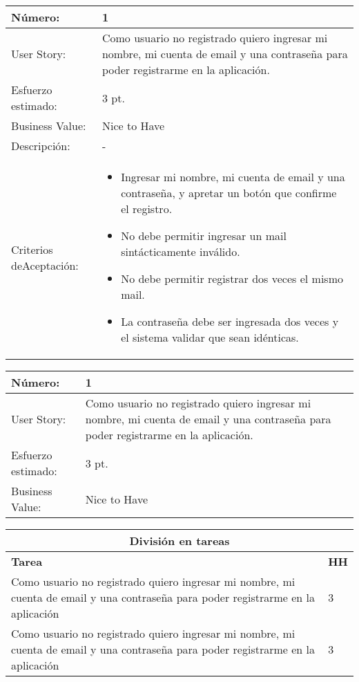 \documentclass[a4paper]{article}
\newcommand{\sprintstory}[6]{\begin{tabular}{| p{3cm} | p{12cm} |}
 \hline
 Número: & #1 \\
 \hline
 User Story: & #2 \\
 \hline
 Esfuerzo estimado: & #3 \\
 \hline
 Business Value: & #4 \\
 \hline
 Descripción: & #5 \\
 \hline
 Criterios de\newline Aceptación: & #6 \\
 \hline
\end{tabular}}
\newcommand{\simplestory}[4]{\begin{tabular}{| p{3cm} | p{12cm} |}
 \hline
 Número: & #1 \\
 \hline
 User Story: & #2 \\
 \hline
 Esfuerzo estimado: & #3 \\
 \hline
 Business Value: & #4 \\
 \hline
\end{tabular}}
\newenvironment{taskstable}
{ \begin{tabular}{| p{14cm} | p{1cm} |}
 \hline
 \multicolumn{2}{|c|}{{\bf División en tareas}}\\
 \hline
 {\bf Tarea} & {\bf HH}\\
 \hline }
{ \end{tabular} }
\newcommand{\task}[2]{#1 & #2\\
 \hline}
\begin{document}
\thispagestyle{empty}


\makeatletter

\maketitle

\newenvironment{myindentpar}[1]
{\begin{list}{1}
         {\setlength{\leftmargin}{#1}}
         \item[]
}
{\end{list}}

\newpage



\sprintstory
{1}
{Como usuario no registrado quiero ingresar mi nombre, mi cuenta de email y una contraseña para poder registrarme en la aplicación.}
{3 pt.}
{Nice to Have}
{-}
{\begin{itemize}
  \item Ingresar mi nombre, mi cuenta de email y una contraseña, y apretar un botón que confirme el registro.
  \item No debe permitir ingresar un mail sintácticamente inválido.
  \item No debe permitir registrar dos veces el mismo mail.
  \item La contraseña debe ser ingresada dos veces y el sistema validar que sean idénticas.
\end{itemize}}

\vspace{1cm}

\simplestory
{1}
{Como usuario no registrado quiero ingresar mi nombre, mi cuenta de email y una contraseña para poder registrarme en la aplicación.}
{3 pt.}
{Nice to Have}

            
\begin{taskstable}
 \task
 {Como usuario no registrado quiero ingresar mi nombre, mi cuenta de email y una contraseña para poder registrarme en la aplicación}
 {3}
 
 \task
 {Como usuario no registrado quiero ingresar mi nombre, mi cuenta de email y una contraseña para poder registrarme en la aplicación}
 {3}
\end{taskstable}








\newpage



\end{document}
